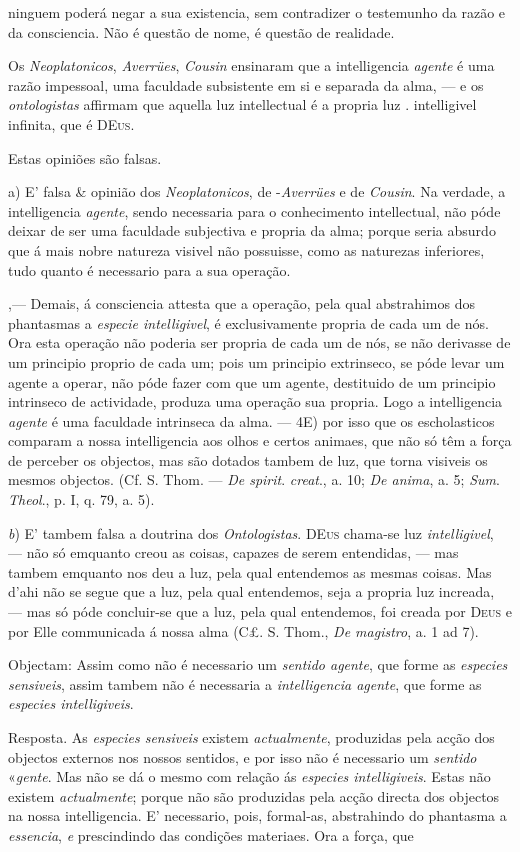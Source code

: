 ninguem poderá negar a sua existencia, sem contradizer o testemunho da razão e da consciencia. Não é questão de nome, é questão de realidade.\par Os \emph{Neoplatonicos}, \emph{Averrües}, \emph{Cousin} ensinaram que a intelligencia \emph{agente} é uma razão impessoal, uma faculdade subsistente em si e separada da alma, --- e os \emph{ontologistas} affirmam que aquella luz intellectual é a propria luz . intelligivel infinita, que é \textsc{DEus}.\par Estas opiniões são falsas.\par a) E' falsa \& opinião dos \emph{Neoplatonicos}, de -\emph{Averrües} e de \emph{Cousin}. Na verdade, a intelligencia \emph{agente}, sendo necessaria para o conhecimento intellectual, não póde deixar de ser uma faculdade subjectiva e propria da alma; porque seria absurdo que á mais nobre natureza visivel não possuisse, como as naturezas inferiores, tudo quanto é necessario para a sua operação.\par ,--- Demais, á consciencia attesta que a operação, pela qual abstrahimos dos phantasmas a \emph{especie intelligivel}, é exclusivamente propria de cada um de nós. Ora esta operação não poderia ser propria de cada um de nós, se não derivasse de um principio proprio de cada um; pois um principio extrinseco, se póde levar um agente a operar, não póde fazer com que um agente, destituido de um principio intrinseco de actividade, produza uma operação sua propria. Logo a intelligencia \emph{agente} é uma faculdade intrinseca da alma. --- 4E) por isso que os escholasticos comparam a nossa intelligencia aos olhos e certos animaes, que não só têm a força de perceber os objectos, mas são dotados tambem de luz, que torna visiveis os mesmos objectos. (Cf. S. Thom. --- \emph{De spirit}. \emph{creat}., a. 10; \emph{De anima}, a. 5; \emph{Sum}. \emph{Theol}., p. I, q. 79, a. 5).\par \emph{b}) E' tambem falsa a doutrina dos \emph{Ontologistas}. \textsc{DEus} chama-se luz \emph{intelligivel}, --- não só emquanto creou as coisas, capazes de serem entendidas, --- mas tambem emquanto nos deu a luz, pela qual entendemos as mesmas coisas. Mas d'ahi não se segue que a luz, pela qual entendemos, seja a propria luz increada, --- mas só póde concluir-se que a luz, pela qual entendemos, foi creada por \textsc{Deus} e por Elle communicada á nossa alma (C£. S. Thom., \emph{De magistro}, a. 1 ad 7).\par Objectam: Assim como não é necessario um \emph{sentido agente}, que forme as \emph{especies sensiveis}, assim tambem não é necessaria a \emph{intelligencia agente}, que forme as \emph{especies intelligiveis}.\par Resposta. As \emph{especies sensiveis} existem \emph{actualmente}, produzidas pela acção dos objectos externos nos nossos sentidos, e por isso não é necessario um \emph{sentido} «\emph{gente}. Mas não se dá o mesmo com relação ás \emph{especies intelligiveis}. Estas não existem \emph{actualmente}; porque não são produzidas pela acção directa dos objectos na nossa intelligencia. E' necessario, pois, formal-as, abstrahindo do phantasma a \emph{essencia}, \emph{e} prescindindo das condições materiaes. Ora a força, que 